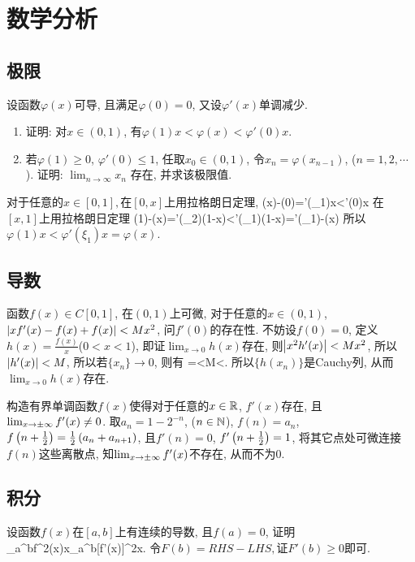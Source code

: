 \chapter{数学分析}
\section{极限}
\bq{}{}
设函数$\varphi(x)$可导, 且满足$\varphi(0)=0$, 又设$\varphi'(x)$单调减少. 
\begin{enumerate}
\item 证明: 对$x\in(0,1)$, 有$\varphi(1)x<\varphi(x)<\varphi'(0)x$.
\item 若$\varphi(1)\ge0$, $\varphi'(0)\le1$, 任取$x_{0}\in(0,1)$, 令$x_{n}=\varphi(x_{n-1})$,
($n=1,2,\cdots$). 证明: $\lim_{n\to\infty}x_{n}$ 存在, 并求该极限值.
\end{enumerate}
\eq
\ba
对于任意的$x\in[0,1],$在$[0,x]$上用拉格朗日定理,
\bee
\varphi(x)-\varphi(0)=\varphi'(\xi_{1})x<\varphi'(0)x
\eee
在$[x,1]$上用拉格朗日定理
\bee
\varphi(1)-\varphi(x)=\varphi'(\xi_{2})(1-x)<\varphi'(\xi_{1})(1-x)=\varphi'(\xi_{1})-\varphi(x)
\eee
所以$\varphi(1)x<\varphi'(\xi_{1})x=\varphi(x)$.
\ea

\section{导数}

\bq{}{}
函数$f(x)\in C[0,1]$, 在$(0,1)$上可微, 对于任意的$x\in(0,1)$, $\left\lvert xf'(x)-f(x)+f(x)\right\rvert<Mx^2$, 问$f'(0)$的存在性.
\eq
\ba
不妨设$f(0)=0$, 定义$h(x)=\frac{f(x)}{x}$($0<x<1$), 即证$\lim_{x\to0}h(x)$存在, 则$\left\lvert x^2h'(x)\right\rvert<Mx^2$,
所以$\left\lvert h'(x)\right\rvert<M$, 所以若$\{x_n\}\to0$, 则有
\bee
{}=<M<\varepsilon.
\eee
所以$\{h(x_n)\}$是Cauchy列, 从而$\lim_{x\to0}h(x)$存在.
\ea

\bq{}{}
构造有界单调函数$f(x)$使得对于任意的$x\in\mathbb{R}$, $f'(x)$存在, 且$\lim_{x\to\pm\infty}f'(x)\ne0$.
\eq
\ba
取$a_n=1-2^{-n}$, ($n\in\mathbb{N}$), $f(n)=a_n$, $f\left(n+\frac12\right)=\frac12\left(a_n+a_{n+1}\right)$, 
且$f'(n)=0$, $f'\left(n+\frac12\right)=1$, 将其它点处可微连接$f(n)$这些离散点, 知$\lim_{x\to\pm\infty}f'(x)$不存在, 从而不为0.
\ea

\section{积分}

\bq{}{}
设函数$f(x)$在$[a,b]$上有连续的导数, 且$f(a)=0$, 证明
\bee
\int_{a}^{b}f^{2}(x)x\le{}\int_{a}^{b}[f'(x)]^{2}x.
\eee
\eq
\ba
令$F(b)=RHS-LHS,$证$F'(b)\ge0$即可.
\ea

